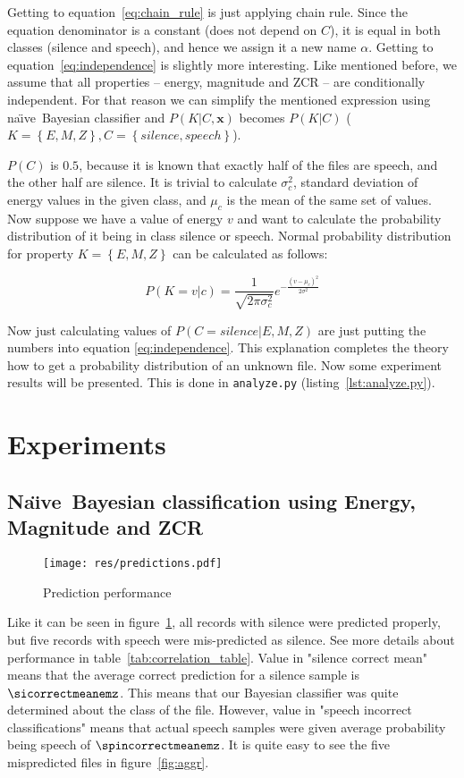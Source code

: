 \documentclass[english,11pt]{article}
\numberwithin{equation}{section}
\newcommand{\naive}{na\"{\i}ve\ }
\newcommand{\Naive}{Na\"{\i}ve\ }
\begin{document}
Getting to equation~\ref{eq:chain_rule} is just applying chain rule. Since the
equation denominator is a constant (does not depend on $C$), it is equal in
both classes (silence and speech), and hence we assign it a new name $\alpha$.
Getting to equation~\ref{eq:independence} is slightly more interesting. Like
mentioned before, we assume that all properties -- energy, magnitude and ZCR --
are conditionally independent. For that reason we can simplify the mentioned
expression using \naive Bayesian classifier and $P(K | C, \mathbf{x})$ becomes
$P(K|C)$ ($K = \left\{E, M, Z\right\}, C = \left\{ silence, speech \right\}$).

$P(C)$ is $0.5$, because it is known that exactly half of the files are speech,
and the other half are silence. It is trivial to calculate $\sigma_{c}^{2}$,
standard deviation of energy values in the given class, and $\mu_{c}$ is the
mean of the same set of values. Now suppose we have a value of energy $v$ and
want to calculate the probability distribution of it being in class silence or
speech. Normal probability distribution for property $K = \left\{E, M,
Z\right\}$ can be calculated as follows:

$$
P(K = v|c) = \frac{1}{\sqrt{2 \pi \sigma_{c}^{2}}}
e ^{- \frac{ (v - \mu_{c})^2 }{2 \sigma^2} }
$$

Now just calculating values of $P(C=silence| E, M, Z)$ are just putting the
numbers into equation \ref{eq:independence}. This explanation completes the
theory how to get a probability distribution of an unknown file. Now some
experiment results will be presented. This is done in \texttt{analyze.py}
(listing~\ref{lst:analyze.py}).

\section{Experiments}

\subsection{\Naive Bayesian classification using Energy, Magnitude and ZCR}

\begin{figure}
    \centering
    \texttt{[image: res/predictions.pdf]}
    \caption{Prediction performance}
    \label{fig:simple_performance}
\end{figure}

Like it can be seen in figure~\ref{fig:simple_performance}, all records with
silence were predicted properly, but five records with speech were
mis-predicted as silence. See more details about performance in
table~\ref{tab:correlation_table}. Value in "silence correct mean" means that
the average correct prediction for a silence sample is $\sicorrectmeanemz$. This
means that our Bayesian classifier was quite determined about the class of the
file. However, value in "speech incorrect classifications" means that actual
speech samples were given average probability being speech of
$\spincorrectmeanemz$. It is quite easy to see the five mispredicted files in
figure~\ref{fig:aggr}.
\end{document}
